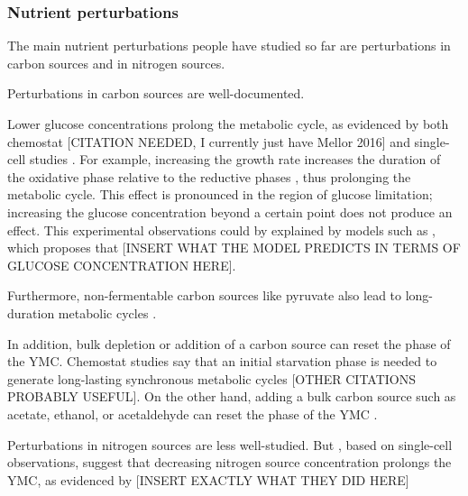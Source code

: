 \subsubsection{Nutrient perturbations}
\label{subsubsec:intro-ymc-perturbations-nutrient}

The main nutrient perturbations people have studied so far are perturbations in carbon sources and in nitrogen sources.

Perturbations in carbon sources are well-documented.

Lower glucose concentrations prolong the metabolic cycle, as evidenced by both chemostat [CITATION NEEDED, I currently just have Mellor 2016] and single-cell studies \parencite{papagiannakisAutonomousMetabolicOscillations2017}.
For example, increasing the growth rate increases the duration of the oxidative phase relative to the reductive phases \citep{slavovCouplingGrowthRate2011}, thus prolonging the metabolic cycle.
This effect is pronounced in the region of glucose limitation;
increasing the glucose concentration beyond a certain point does not produce an effect.
This experimental observations could by explained by models such as \textcite{jonesCyberneticModelGrowth1999}, which proposes that [INSERT WHAT THE MODEL PREDICTS IN TERMS OF GLUCOSE CONCENTRATION HERE].

Furthermore, non-fermentable carbon sources like pyruvate also lead to long-duration metabolic cycles \parencite{papagiannakisAutonomousMetabolicOscillations2017}.

In addition, bulk depletion or addition of a carbon source can reset the phase of the YMC.
Chemostat studies say that an initial starvation phase is needed to generate long-lasting synchronous metabolic cycles \parencite{tuLogicYeastMetabolic2005} [OTHER CITATIONS PROBABLY USEFUL].
On the other hand, adding a bulk carbon source such as acetate, ethanol, or acetaldehyde can reset the phase of the YMC \citep{kuangMsn2RegulateExpression2017, krishnaMinimalPushPull2018}.

Perturbations in nitrogen sources are less well-studied.
But \textcite{baumgartnerFlavinbasedMetabolicCycles2018}, based on single-cell observations, suggest that decreasing nitrogen source concentration prolongs the YMC, as evidenced by [INSERT EXACTLY WHAT THEY DID HERE]

